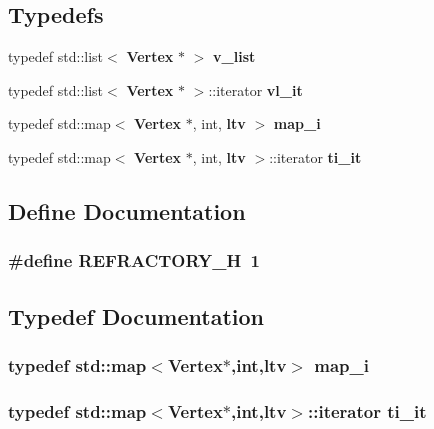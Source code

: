 \subsection*{Typedefs}
\begin{CompactItemize}
\item 
typedef std::list$<$ {\bf Vertex} $\ast$ $>$ {\bf v\_\-list}
\item 
typedef std::list$<$ {\bf Vertex} $\ast$ $>$::iterator {\bf vl\_\-it}
\item 
typedef std::map$<$ {\bf Vertex} $\ast$, int, {\bf ltv} $>$ {\bf map\_\-i}
\item 
typedef std::map$<$ {\bf Vertex} $\ast$, int, {\bf ltv} $>$::iterator {\bf ti\_\-it}
\end{CompactItemize}


\subsection{Define Documentation}
\subsubsection{\setlength{\rightskip}{0pt plus 5cm}\#define REFRACTORY\_\-H~1}\label{refractory_8h_a99c01b61edf05eaee110863cf2d512c}




\subsection{Typedef Documentation}
\subsubsection{\setlength{\rightskip}{0pt plus 5cm}typedef std::map$<${\bf Vertex}$\ast$,int,{\bf ltv}$>$ {\bf map\_\-i}}\label{refractory_8h_c3906daa0e5238cfddc04646b7c21b85}


\subsubsection{\setlength{\rightskip}{0pt plus 5cm}typedef std::map$<${\bf Vertex}$\ast$,int,{\bf ltv}$>$::iterator {\bf ti\_\-it}}\label{refractory_8h_9a60fd4641a43692632d09c3cdffb1a2}


